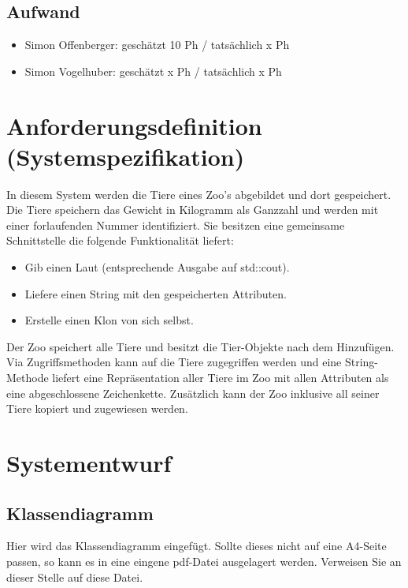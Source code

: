 \documentclass[12pt,naustrian,a4widepaper]{scrartcl}
\begin{document}
\subsection{Aufwand}
	
	\begin{itemize}
		\item Simon Offenberger: geschätzt 10 Ph / tatsächlich x Ph
		\item Simon Vogelhuber:  geschätzt x Ph / tatsächlich x Ph
	\end{itemize}

\clearpage
\section{Anforderungsdefinition (Systemspezifikation)}

In diesem System werden die Tiere eines Zoo's abgebildet und dort gespeichert. Die Tiere speichern das Gewicht in Kilogramm als Ganzzahl und werden mit einer forlaufenden Nummer identifiziert. Sie besitzen eine gemeinsame Schnittstelle die folgende Funktionalität liefert:
\begin{itemize}
	\item Gib einen Laut (entsprechende Ausgabe auf std::cout).
	\item Liefere einen String mit den gespeicherten Attributen.
	\item Erstelle einen Klon von sich selbst.
\end{itemize}

Der Zoo speichert alle Tiere und besitzt die Tier-Objekte nach dem Hinzufügen. Via Zugriffsmethoden kann auf die Tiere zugegriffen werden und eine String-Methode liefert eine Repräsentation aller Tiere im Zoo mit allen Attributen als eine abgeschlossene Zeichenkette. Zusätzlich kann der Zoo inklusive all seiner Tiere kopiert und zugewiesen werden.

\clearpage
\section{Systementwurf}

\subsection{Klassendiagramm}
\color{blue}
Hier wird das Klassendiagramm eingefügt. Sollte dieses nicht auf eine A4-Seite passen, so kann es in eine eingene pdf-Datei ausgelagert werden.
Verweisen Sie an dieser Stelle auf diese Datei.
\color{black}
\end{document}
